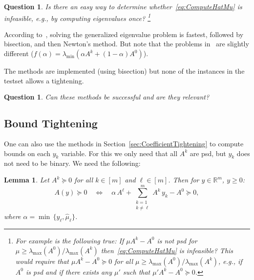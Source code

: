 \documentclass[10pt, a4paper]{article}
\newcommand{\R}{\mathds{R}}
\newtheorem{lemma}[theorem]{Lemma}
\newtheorem{question}[theorem]{Question}
\begin{document}
\begin{question}
  Is there an easy way to determine whether~\eqref{eq:ComputeHatMu} is
  infeasible, e.g., by computing eigenvalues once?  \footnote{For example
    is the following true: If $\mu A^k - A^0$ is not psd for
    $\mu \geq \lambda_{\max}(A^0)/\lambda_{\max}(A^k)$ then~\eqref{eq:ComputeHatMu} is
    infeasible? This would require that $\mu A^k - A^0 \succeq 0$ for all
    $\mu \geq \lambda_{\max}(A^0) / \lambda_{\max}(A^k)$, e.g., if $A^0$ is
    psd and if there exists any $\mu'$ such that $\mu' A^k - A^0 \succeq 0$.}
\end{question}

According to~\cite{Str16,HigSS16}, solving the generalized eigenvalue
problem is fastest, followed by bisection, and then Newton's method. But
note that the problems in~\cite{Str16,HigSS16} are slightly different
($f(\alpha) = \lambda_{\min}(\alpha A^k + (1 - \alpha) A^0)$).

The methods are implemented (using bisection) but none of the instances in
the testset allows a tightening.

\begin{question}
  Can these methods be successful and are they relevant?
\end{question}



\subsection{Bound Tightening}

One can also use the methods in Section~\ref{sec:CoefficientTightening} to
compute bounds on each $y_k$ variable. For this we only need that all $A^k$
are psd, but $y_k$ does not need to be binary. We need the following:

\begin{lemma}
  Let $A^k \succeq 0$ for all $k \in [m]$ and $\ell \in [m]$. Then for
  $y \in \R^m$, $y \geq 0$:
  \[
    A(y) \succeq 0 \quad\Leftrightarrow\quad
    \alpha\, A^{\ell} + \sum_{\substack{k=1\\k \neq \ell}}^m A^k\, y_k - A^0 \succeq 0,
  \]
  where $\alpha = \min\,\{y_{\ell},\hat{\mu}_{\ell}\}$.
\end{lemma}
\end{document}
